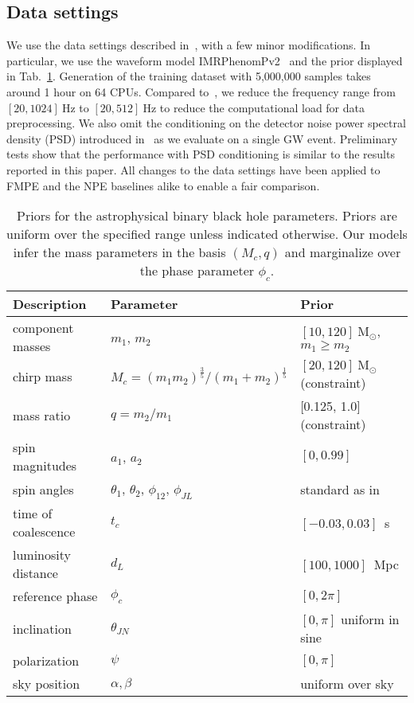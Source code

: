 \documentclass{article}
\theoremstyle{remark}
\begin{document}
\subsection{Data settings}
We use the data settings described in~\cite{Dax:2021tsq}, with a few minor modifications. In particular, we use the waveform model IMRPhenomPv2~\cite{Hannam:2013oca,Khan:2015jqa,Bohe:2016} and the prior displayed in Tab.~\ref{tab:GW-parameters-with-priors}.  Generation of the training dataset with 5,000,000 samples takes around 1 hour on 64 CPUs. Compared to~\cite{Dax:2021tsq}, we reduce the frequency range from $[20,1024]~\text{Hz}$ to $[20,512]~\text{Hz}$ to reduce the computational load for data preprocessing. We also omit the conditioning on the detector noise power spectral density (PSD) introduced in~\cite{Dax:2021tsq} as we evaluate on a single GW event. Preliminary tests show that the performance with PSD conditioning is similar to the results reported in this paper. All changes to the data settings have been applied to FMPE and the NPE baselines alike to enable a fair comparison. 
\begin{table}
    \centering
    \begin{tabular}{lll}
        \toprule
        Description & Parameter & Prior\\\midrule
        component masses & $m_1$, $m_2$ & $[10,120]~\mathrm{M}_\odot$, $m_1\geq m_2$ \\
        chirp mass & $M_c=(m_1 m_2)^{\frac{3}{5}} / (m_1 + m_2)^{\frac{1}{5}}$ & $[20,120]~\mathrm{M}_\odot$ (constraint)\\
        mass ratio & $q=m_2 / m_1$ & [0.125, 1.0] (constraint)\\
        spin magnitudes & $a_1$, $a_2$ & $[0,0.99]$\\ 
        spin angles & $\theta_1$, $\theta_2$, $\phi_{12}$, $\phi_{JL}$ & standard as in~\cite{Farr:2014qka}\\
        time of coalescence & $t_c$ & $[-0.03,0.03]$~s\\
        luminosity distance & $d_L$ & $[100,1000]$~Mpc\\
        reference phase & $\phi_c$ & $[0,2\pi]$\\
        inclination & $\theta_{JN}$ & $[0,\pi]$ uniform in sine \\
        polarization & $\psi$ & $[0,\pi]$ \\
        sky position & $\alpha, \beta$ & uniform over sky
        \\\bottomrule
    \end{tabular}
    \caption{
    \label{tab:GW-parameters-with-priors}
    Priors for the astrophysical binary black hole parameters. Priors are uniform over the specified range unless indicated otherwise. Our models infer the mass parameters in the basis $(M_c,q)$ and marginalize over the phase parameter $\phi_c$.
    }
\end{table}
\end{document}
